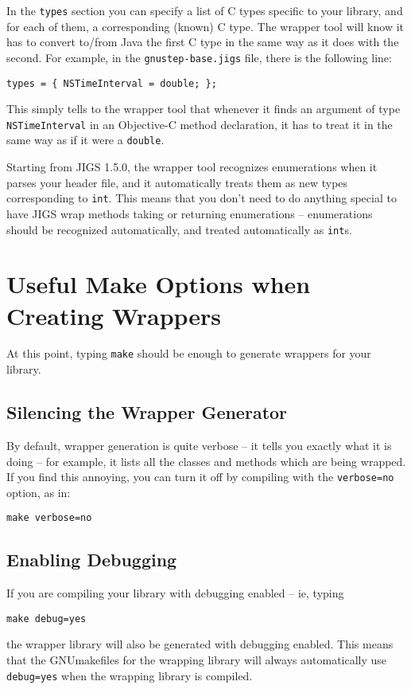 In the \texttt{types} section you can specify a list of C types
specific to your library, and for each of them, a corresponding
(known) C type.  The wrapper tool will know it has to convert to/from
Java the first C type in the same way as it does with the second.  For
example, in the \texttt{gnustep-base.jigs} file, there is the
following line:
\begin{verbatim}
types = { NSTimeInterval = double; };
\end{verbatim}
This simply tells to the wrapper tool that whenever it finds an argument 
of type \texttt{NSTimeInterval} in an Objective-C method declaration, it 
has to treat it in the same way as if it were a \texttt{double}.

Starting from JIGS 1.5.0, the wrapper tool recognizes enumerations
when it parses your header file, and it automatically treats them as
new types corresponding to \texttt{int}.  This means that you don't
need to do anything special to have JIGS wrap methods taking or
returning enumerations -- enumerations should be recognized
automatically, and treated automatically as \texttt{int}s.

\section{Useful Make Options when Creating Wrappers}

At this point, typing \texttt{make} should be enough to generate
wrappers for your library.  

\subsection{Silencing the Wrapper Generator}

By default, wrapper generation is quite verbose -- it tells you
exactly what it is doing -- for example, it lists all the classes and
methods which are being wrapped.  If you find this annoying, you can
turn it off by compiling with the \texttt{verbose=no} option, as in:
\begin{verbatim}
make verbose=no
\end{verbatim}

\subsection{Enabling Debugging}

If you are compiling your library with debugging enabled  -- ie, typing
\begin{verbatim}
make debug=yes
\end{verbatim}
the wrapper library will also be generated with debugging enabled.
This means that the GNUmakefiles for the wrapping library will
always automatically use \texttt{debug=yes} when the wrapping library
is compiled.

